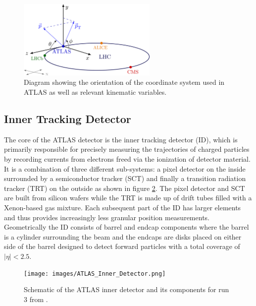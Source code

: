 \begin{figure}
\centering
    \includegraphics[width=0.6\textwidth]{images/ATLAS_Coordinate_System.png}
    \caption{Diagram showing the orientation of the coordinate system used in ATLAS as well as relevant kinematic 
    variables.}
    \label{fig:ATLAS_Coordinate_System}
\end{figure}

\subsection{Inner Tracking Detector}

The core of the ATLAS detector \cite{atlas-detector} is the inner tracking detector (ID), which is primarily responsible 
for precisely measuring the trajectories of charged particles by recording currents from electrons freed via the 
ionization of detector material. It is a combination of three different sub-systems: a pixel detector on the inside 
surrounded by a semiconductor tracker (SCT) and finally a transition radiation tracker (TRT) on the outside as shown in 
figure \ref{fig:ATLAS_Inner_Detector}. The pixel detector and SCT are built from silicon wafers while the TRT is made up 
of drift tubes filled with a Xenon-based gas mixture. Each subsequent part of the ID has larger elements and thus provides 
increasingly less granular position measurements. Geometrically the ID consists of barrel and endcap components where the 
barrel is a cylinder surrounding the beam and the endcaps are disks placed on either side of the barrel designed to detect 
forward particles with a total coverage of $|\eta| < 2.5$. \par

\begin{figure}
\centering
    \texttt{[image: images/ATLAS\_Inner\_Detector.png]}
    \caption{Schematic of the ATLAS inner detector and its components for run 3 from \cite{atlas-run3-setup}.}
    \label{fig:ATLAS_Inner_Detector}
\end{figure}

